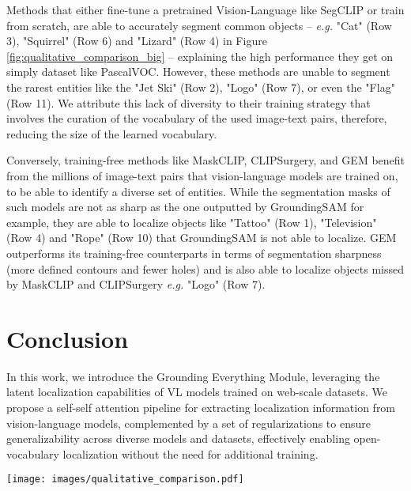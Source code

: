 \documentclass[10pt,twocolumn,letterpaper]{article}
\begin{document}
Methods that either fine-tune a pretrained Vision-Language like SegCLIP or train from scratch, are able to accurately segment common objects -- \textit{e.g.} "Cat" (Row 3), "Squirrel" (Row 6) and "Lizard" (Row 4) in Figure \ref{fig:qualitative_comparison_big} -- explaining the high performance they get on simply dataset like PascalVOC. However, these methods are unable to segment the rarest entities like the "Jet Ski" (Row 2), "Logo" (Row 7), or even the "Flag" (Row 11). We attribute this lack of diversity to their training strategy that involves the curation of the vocabulary of the used image-text pairs, therefore, reducing the size of the learned vocabulary.

Conversely, training-free methods like MaskCLIP, CLIPSurgery, and GEM benefit from the millions of image-text pairs that vision-language models are trained on, to be able to identify a diverse set of entities. While the segmentation masks of such models are not as sharp as the one outputted by GroundingSAM for example, they are able to localize objects like "Tattoo" (Row 1), "Television" (Row 4) and "Rope" (Row 10) that GroundingSAM is not able to localize. GEM outperforms its training-free counterparts in terms of segmentation sharpness (more defined contours and fewer holes) and is also able to localize objects missed by MaskCLIP and CLIPSurgery \textit{e.g.} "Logo" (Row 7).



 \section{Conclusion}

In this work, we introduce the Grounding Everything Module, leveraging the latent localization capabilities of VL models trained on web-scale datasets. We propose a self-self attention pipeline for extracting localization information from vision-language models, complemented by a set of regularizations to ensure generalizability across diverse models and datasets, effectively enabling open-vocabulary localization without the need for additional training.



\begin{figure*}[t]
\centering
      \texttt{[image: images/qualitative\_comparison.pdf]}
     \caption{Qualitative comparison between different open-vocabulary segmentation methods, namely, GroundingSAM, OVSeg, SegCLIP, GroupViT, MaskCLIP, CLIPSurgery and GEM.}\label{fig:qualitative_comparison_big}
\end{figure*}
 {
    \small
    
    
}
\end{document}
